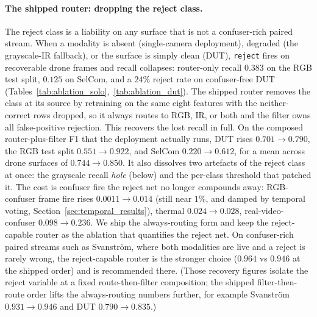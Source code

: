 
\paragraph{The shipped router: dropping the reject class.}
The reject class is a liability on any surface that is not a confuser-rich paired stream. When a modality is absent (single-camera deployment), degraded (the grayscale-IR fallback), or the surface is simply clean (DUT), \texttt{reject} fires on recoverable drone frames and recall collapses: router-only recall $0.383$ on the RGB test split, $0.125$ on SelCom, and a $24\%$ reject rate on confuser-free DUT (Tables~\ref{tab:ablation_solo},~\ref{tab:ablation_dut}). The shipped router removes the class at its source by retraining on the same eight features with the neither-correct rows dropped, so it always routes to RGB, IR, or both and the filter owns all false-positive rejection. This recovers the lost recall in full. On the composed router-plus-filter F1 that the deployment actually runs, DUT rises $0.701\to0.790$, the RGB test split $0.551\to0.922$, and SelCom $0.220\to0.612$, for a mean across drone surfaces of $0.744\to0.850$. It also dissolves two artefacts of the reject class at once: the grayscale recall \emph{hole} (below) and the per-class threshold that patched it. The cost is confuser fire the reject net no longer compounds away: RGB-confuser frame fire rises $0.0011\to0.014$ (still near $1\%$, and damped by temporal voting, Section~\ref{sec:temporal_results}), thermal $0.024\to0.028$, real-video-confuser $0.098\to0.236$. We ship the always-routing form and keep the reject-capable router as the ablation that quantifies the reject net. On confuser-rich paired streams such as Svanstr\"om, where both modalities are live and a reject is rarely wrong, the reject-capable router is the stronger choice ($0.964$ vs $0.946$ at the shipped order) and is recommended there. (Those recovery figures isolate the reject variable at a fixed route-then-filter composition; the shipped filter-then-route order lifts the always-routing numbers further, for example Svanstr\"om $0.931\to0.946$ and DUT $0.790\to0.835$.)

